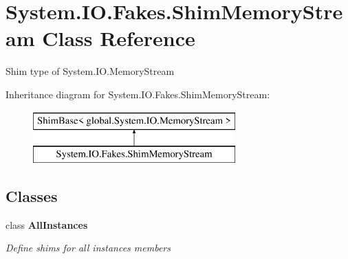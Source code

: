 \hypertarget{class_system_1_1_i_o_1_1_fakes_1_1_shim_memory_stream}{\section{System.\-I\-O.\-Fakes.\-Shim\-Memory\-Stream Class Reference}
\label{class_system_1_1_i_o_1_1_fakes_1_1_shim_memory_stream}
}


Shim type of System.\-I\-O.\-Memory\-Stream 


Inheritance diagram for System.\-I\-O.\-Fakes.\-Shim\-Memory\-Stream\-:\begin{figure}[H]
\begin{center}
\leavevmode
\includegraphics[height=2.000000cm]{class_system_1_1_i_o_1_1_fakes_1_1_shim_memory_stream}
\end{center}
\end{figure}
\subsection*{Classes}
\begin{DoxyCompactItemize}
\item 
class {\bfseries All\-Instances}
\begin{DoxyCompactList}\small\item\em Define shims for all instances members\end{DoxyCompactList}\end{DoxyCompactItemize}
